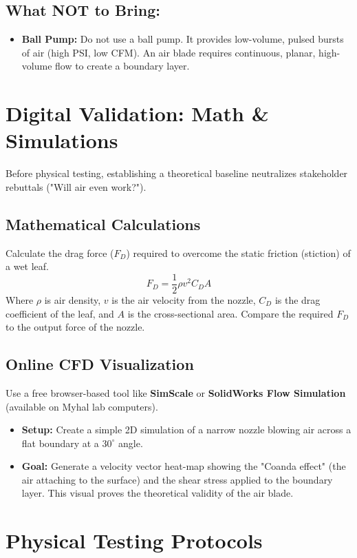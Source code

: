 \documentclass{article}
\begin{document}
\subsection{What NOT to Bring:}
\begin{itemize}
    \item \textbf{Ball Pump:} Do not use a ball pump. It provides low-volume, pulsed bursts of air (high PSI, low CFM). An air blade requires continuous, planar, high-volume flow to create a boundary layer.
\end{itemize}

\section{Digital Validation: Math \& Simulations}
Before physical testing, establishing a theoretical baseline neutralizes stakeholder rebuttals ("Will air even work?"). 

\subsection{Mathematical Calculations}
Calculate the drag force ($F_D$) required to overcome the static friction (stiction) of a wet leaf.
\begin{equation}
    F_D = \frac{1}{2} \rho v^2 C_D A
\end{equation}
Where $\rho$ is air density, $v$ is the air velocity from the nozzle, $C_D$ is the drag coefficient of the leaf, and $A$ is the cross-sectional area. Compare the required $F_D$ to the output force of the nozzle.

\subsection{Online CFD Visualization}
Use a free browser-based tool like \textbf{SimScale} or \textbf{SolidWorks Flow Simulation} (available on Myhal lab computers).
\begin{itemize}
    \item \textbf{Setup:} Create a simple 2D simulation of a narrow nozzle blowing air across a flat boundary at a $30^\circ$ angle.
    \item \textbf{Goal:} Generate a velocity vector heat-map showing the "Coanda effect" (the air attaching to the surface) and the shear stress applied to the boundary layer. This visual proves the theoretical validity of the air blade.
\end{itemize}

\section{Physical Testing Protocols}
\end{document}

